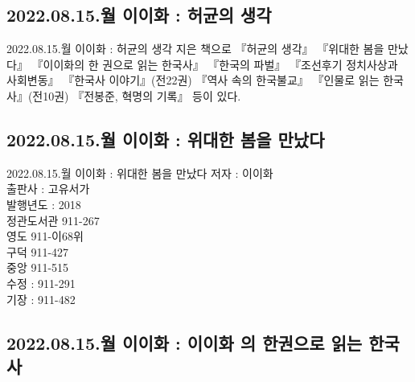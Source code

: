 \documentclass[aspectratio=1610,17pt,xcolor=pdftex,dvipsnames,table,handout]{beamer}
\begin{document}
		\subsection{2022.08.15.월  이이화 : 허균의 생각}
		
		\begin{frame} [t,plain]
			\begin{block} {2022.08.15.월  이이화 : 허균의 생각}
지은 책으로 『허균의 생각』 『위대한 봄을 만났다』 『이이화의 한 권으로 읽는 한국사』 『한국의 파벌』 『조선후기 정치사상과 사회변동』 『한국사 이야기』(전22권) 『역사 속의 한국불교』 『인물로 읽는 한국사』(전10권) 『전봉준, 혁명의 기록』 등이 있다.

			\end{block}
		\end{frame}

		\subsection{2022.08.15.월  이이화 : 위대한 봄을 만났다}
		
		\begin{frame} [t,plain]
			\begin{block} {2022.08.15.월  이이화 : 위대한 봄을 만났다}
			저자 : 이이화\\
			출판사 : 고유서가 	\\
			발행년도 : 2018\\
정관도서관 911-267\\
영도 911-이68위 \\
구덕 911-427 \\
중앙 911-515 \\
수정 : 911-291 \\
기장 : 911-482
			\end{block}
		\end{frame}


		\subsection{2022.08.15.월  이이화 : 이이화 의 한권으로 읽는 한국사 }
		
\end{document}
